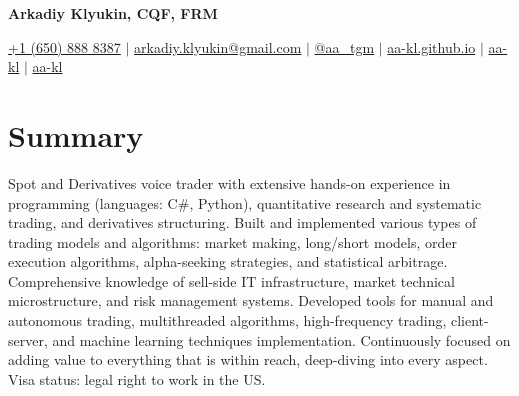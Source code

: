 \documentclass[a4paper,hidelinks]{article}
\begin{document}

\begin{center}
  \textbf{\Huge{Arkadiy Klyukin, CQF, FRM}} \\ \vspace{4pt}
  
  \small
  \faMobile* \hspace{.5pt} \href{tel:+16508888387}{+1 (650) 888 8387}
  $|$
  \faAt \hspace{.5pt} \href{mailto:arkadiy.klyukin@gmail.com}{arkadiy.klyukin@gmail.com}
  $|$
  \faTelegramPlane \hspace{.5pt} \href{https://t.me/aa_tgm}{@aa\_tgm}
  $|$
  \faGlobeAmericas \hspace{.5pt} \href{https://aa-kl.github.io}{aa-kl.github.io}
  $|$
  \faLinkedinIn \hspace{.5pt} \href{https://www.linkedin.com/in/aa-kl}{aa-kl}
  $|$
  \faGithub \hspace{.5pt} \href{https://github.com/aa-kl}{aa-kl}
\end{center}

\vspace{-12pt}
\section{Summary}
Spot and Derivatives voice trader with extensive hands-on experience in programming (languages: C#, Python), quantitative research and systematic trading, and derivatives structuring. Built and implemented various types of trading models and algorithms: market making, long/short models, order execution algorithms, alpha-seeking strategies, and statistical arbitrage. Comprehensive knowledge of sell-side IT infrastructure, market technical microstructure, and risk management systems. Developed tools for manual and autonomous trading, multithreaded algorithms, high-frequency trading, client-server, and machine learning techniques implementation. Continuously focused on adding value to everything that is within reach, deep-diving into every aspect. Visa status: legal right to work in the US.\\
\end{document}
